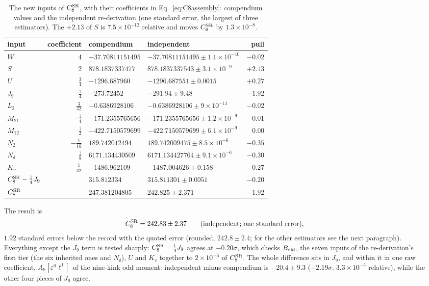 \documentclass[11pt,a4paper]{article}
\numberwithin{equation}{section}
\newcommand{\CSR}{C^{\rm SR}}
\newcommand{\sci}[2]{#1\times10^{#2}}
\begin{document}
\begin{table}[htbp]\centering\small
\renewcommand{\arraystretch}{1.15}
\begin{tabular}{@{}lrllr@{}}
\toprule
input & coefficient & compendium & independent & pull\\
\midrule
$W$ & $4$ & $-37.70811151495$ & $-37.70811151495\pm\sci{1.1}{-10}$ & $-0.02$\\
$S$ & $2$ & $878.1837337477$ & $878.1837337543\pm\sci{3.1}{-9}$ & $+2.13$\\
$U$ & $\frac34$ & $-1296.687960$ & $-1296.687551\pm0.0015$ & $+0.27$\\
$J_9$ & $\frac14$ & $-273.72452$ & $-291.94\pm9.48$ & $-1.92$\\
$L_3$ & $\frac3{32}$ & $-0.6386928106$ & $-0.6386928106\pm\sci{9}{-11}$ & $-0.02$\\
$M_{21}$ & $-\frac14$ & $-171.2355765656$ & $-171.2355765656\pm\sci{1.2}{-9}$ & $-0.01$\\
$M_{12}$ & $\frac12$ & $-422.7150579699$ & $-422.7150579699\pm\sci{6.1}{-9}$ & $0.00$\\
$N_2$ & $-\frac1{16}$ & $189.742012494$ & $189.742009475\pm\sci{8.5}{-6}$ & $-0.35$\\
$N_\delta$ & $\frac18$ & $6171.134430509$ & $6171.134427764\pm\sci{9.1}{-6}$ & $-0.30$\\
$K_v$ & $\frac1{32}$ & $-1486.962109$ & $-1487.004626\pm0.158$ & $-0.27$\\
\midrule
$\CSR_8-\frac14J_9$ & & $315.812334$ & $315.811301\pm0.0051$ & $-0.20$\\
$\CSR_8$ & & $247.381204805$ & $242.825\pm2.371$ & $-1.92$\\
\bottomrule
\end{tabular}
\caption{The new inputs of $\CSR_8$, with their coefficients in Eq.~\eqref{eq:C8assembly}: compendium values and the
independent re-derivation (one standard error, the largest of three estimators). The $+2.13$ of $S$ is
$\sci{7.5}{-12}$ relative and moves $\CSR_8$ by $\sci{1.3}{-8}$.}
\label{tab:C8inputs}
\end{table}

The result is
\begin{equation}
 \CSR_8=242.83\pm2.37\qquad(\text{independent; one standard error}),
\end{equation}
$1.92$ standard errors below the record with the quoted error (rounded, $242.8\pm2.4$; for the other
estimators see the next paragraph). Everything
except the $J_9$ term is tested sharply: $\CSR_8-\frac14J_9$ agrees at $-0.20\sigma$, which checks $B_{\rm old}$, the
seven inputs of the re-derivation's first tier (the six inherited ones and $N_\delta$), $U$ and $K_v$ together to
$\sci{2}{-5}$ of $\CSR_8$. The whole difference sits in $J_9$, and within it in one raw coefficient,
$A_9[\varepsilon^0\ell^1]$ of the nine-kink odd moment: independent minus compendium is $-20.4\pm9.3$
($-2.19\sigma$, $\sci{3.3}{-5}$ relative), while the other four pieces of $J_9$ agree.
\end{document}
